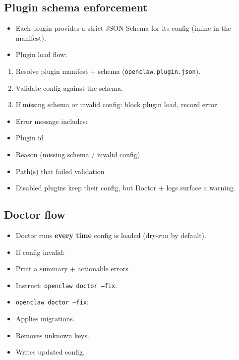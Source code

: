\subsection{Plugin schema enforcement}


\begin{itemize}
  \item Each plugin provides a strict JSON Schema for its config (inline in the manifest).
  \item Plugin load flow:
\end{itemize}

\begin{enumerate}
  \item Resolve plugin manifest + schema (\texttt{openclaw.plugin.json}).
  \item Validate config against the schema.
  \item If missing schema or invalid config: block plugin load, record error.
\end{enumerate}

\begin{itemize}
  \item Error message includes:
  \item Plugin id
  \item Reason (missing schema / invalid config)
  \item Path(s) that failed validation
  \item Disabled plugins keep their config, but Doctor + logs surface a warning.
\end{itemize}


\subsection{Doctor flow}


\begin{itemize}
  \item Doctor runs \textbf{every time} config is loaded (dry-run by default).
  \item If config invalid:
  \item Print a summary + actionable errors.
  \item Instruct: \texttt{openclaw doctor --fix}.
  \item \texttt{openclaw doctor --fix}:
  \item Applies migrations.
  \item Removes unknown keys.
  \item Writes updated config.
\end{itemize}


